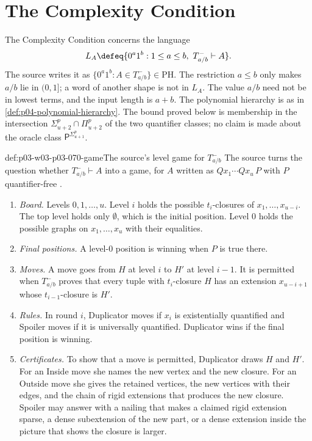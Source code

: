 \section{The Complexity Condition}
\label{sec:p03-w03-p03-070-complexity}

The Complexity Condition concerns the language
\[
  L_A\defeq\{0^a1^b:1\leq a\leq b,\ T^-_{a/b}\vdash A\}.
\]
The source writes it as \(\{0^a1^b:A\in T^-_{a/b}\}\in\mathrm{PH}\).  The
restriction \(a\leq b\) only makes \(a/b\) lie in \((0,1]\); a word of another
shape is not in \(L_A\).  The value \(a/b\) need not be in lowest terms, and
the input length is \(a+b\).  The polynomial hierarchy is as in
\cref{def:p04-polynomial-hierarchy}.  The bound proved below is membership
in the intersection \(\Sigma^p_{u+2}\cap\Pi^p_{u+2}\) of the two quantifier
classes; no claim is made about the oracle class
\(\mathsf P^{\Sigma^p_{u+1}}\).

\begin{hbmethod}{def:p03-w03-p03-070-game}{The source's level game for \(T^-_{a/b}\)}
The source turns the question whether \(T^-_{a/b}\vdash A\) into a game,
for \(A\) written as \(Qx_1\cdots Qx_u\,P\) with \(P\) quantifier-free
\cite[pp.~20--21]{Spencer2007LogicRandomStructuresAuthor}.
\begin{enumerate}
\item \emph{Board.}  Levels \(0,1,\ldots,u\).  Level \(i\) holds the possible
      \(t_i\)-closures of \(x_1,\ldots,x_{u-i}\).  The top level holds only
      \(\emptyset\), which is the initial position.  Level \(0\) holds the
      possible graphs on \(x_1,\ldots,x_u\) with their equalities.
\item \emph{Final positions.}  A level-\(0\) position is winning when \(P\)
      is true there.
\item \emph{Moves.}  A move goes from \(H\) at level \(i\) to \(H'\) at level
      \(i-1\).  It is permitted when \(T^-_{a/b}\) proves that every tuple
      with \(t_i\)-closure \(H\) has an extension \(x_{u-i+1}\) whose
      \(t_{i-1}\)-closure is \(H'\).
\item \emph{Rules.}  In round \(i\), Duplicator moves if \(x_i\) is
      existentially quantified and Spoiler moves if it is universally
      quantified.  Duplicator wins if the final position is winning.
\item \emph{Certificates.}  To show that a move is permitted, Duplicator
      draws \(H\) and \(H'\).  For an Inside move she names the new vertex
      and the new closure.  For an Outside move she gives the retained
      vertices, the new vertices with their edges, and the chain of rigid
      extensions that produces the new closure.  Spoiler may answer with a
      nailing that makes a claimed rigid extension sparse, a dense
      subextension of the new part, or a dense extension inside the picture
      that shows the closure is larger.
\end{enumerate}
\end{hbmethod}

